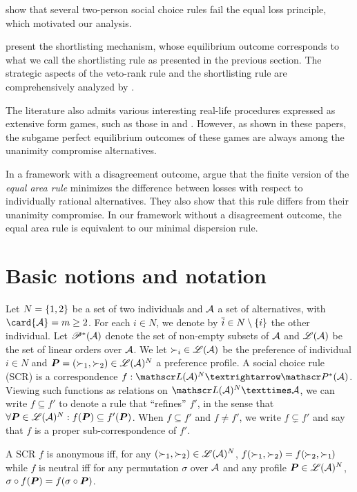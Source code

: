 \documentclass[pagesize, twoside=off, bibliography=totoc, DIV=calc, fontsize=12pt, a4paper]{scrartcl}
\begin{document}
 show that several two-person social choice rules fail the equal loss principle, which motivated our analysis.

 present the shortlisting mechanism, whose equilibrium outcome corresponds to what we call the shortlisting rule as presented in the previous section.
The strategic aspects of the veto-rank rule and the shortlisting rule are comprehensively analyzed by \citet{Clippel}. 

The literature also admits various interesting real-life procedures expressed as extensive form games, such as those in \citet{anbarci1993noncooperative, anbarci2006finite} and \citet{barbera2022compromising}. However, as shown in these papers, the subgame perfect equilibrium outcomes of these games are always among the unanimity compromise alternatives.

In a framework with a disagreement outcome, \citet{KibrisSertel2007} argue that the finite version of the \textit{equal area rule} \citep{thomson1994cooperative} minimizes the difference between losses with respect to individually rational alternatives. They also show that this rule differs from their unanimity compromise. In our framework without a disagreement outcome, the equal area rule is equivalent to our minimal dispersion rule.

\section{Basic notions and notation}
\label{sec:basic}
Let $N = \{1, 2\}$ be a set of two individuals and $\mathcal{A}$  a set of alternatives, with $\card{\allalts} = m\geq 2$.
For each $i \in N$, we denote by $\overline{i} \in N \setminus \{i\}$  the other individual. Let $\mathscr{P}^*(\mathcal{A})$ denote the set of non-empty subsets of $\mathcal{A}$ and $\mathscr{L}(\mathcal{A})$ be the set of linear orders over $\mathcal{A}$. We let ${\prefi} \in \linors$ be the preference of individual $i \in N$ and $\prof = ({\prefi[1]}, {\prefi[2]}) \in \allprofs$ a preference profile.
A social choice rule (SCR) is a correspondence $f: \allprofs → \powersetz{\allalts}$.
Viewing such functions as relations on $\allprofs × \allalts$, we can write $f \subseteq f'$ to denote a rule that “refines” $f'$, in the sense that $\forall \bm{P} \in \mathscr{L}(\mathcal{A})^N: f(\bm{P}) \subseteq f'(\bm{P})$. When $f \subseteq f'$ and $f ≠ f'$, we write $f \subsetneq f'$ and say that $f$ is a proper sub-correspondence of $f'$.

A SCR $f$ is anonymous iff, for any $({\prefi[1]}, {\prefi[2]}) \in \allprofs$, $f({\prefi[1]}, {\prefi[2]}) = f(\hspace{-0.6pt}{\prefi[2]}, {\prefi[1]}\hspace{-0.6pt})$ while $f$ is neutral iff for any permutation $\sigma$ over $\mathcal{A}$ and any profile $\bm{P} \in \mathscr{L}(\mathcal{A})^N$, $\sigma \circ f(\bm{P}) = f(\sigma \circ \bm{P})$.
\end{document}
